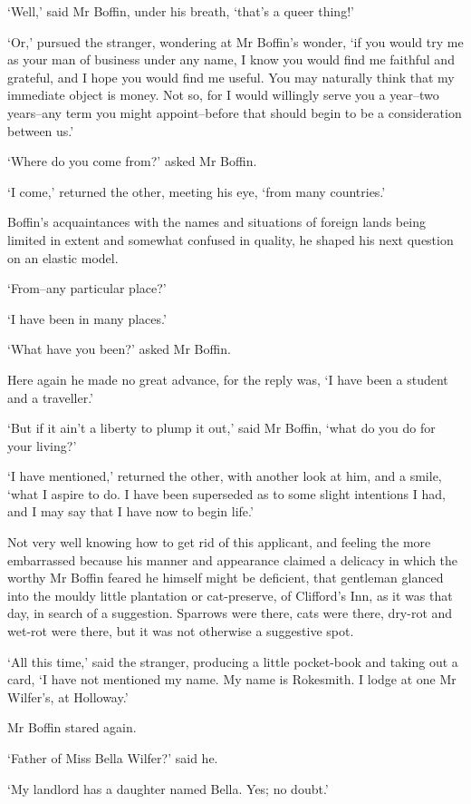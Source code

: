 ‘Well,’ said Mr Boffin, under his breath, ‘that’s a queer thing!’

‘Or,’ pursued the stranger, wondering at Mr Boffin’s wonder, ‘if you
would try me as your man of business under any name, I know you would
find me faithful and grateful, and I hope you would find me useful. You
may naturally think that my immediate object is money. Not so, for
I would willingly serve you a year--two years--any term you might
appoint--before that should begin to be a consideration between us.’

‘Where do you come from?’ asked Mr Boffin.

‘I come,’ returned the other, meeting his eye, ‘from many countries.’

Boffin’s acquaintances with the names and situations of foreign lands
being limited in extent and somewhat confused in quality, he shaped his
next question on an elastic model.

‘From--any particular place?’

‘I have been in many places.’

‘What have you been?’ asked Mr Boffin.

Here again he made no great advance, for the reply was, ‘I have been a
student and a traveller.’

‘But if it ain’t a liberty to plump it out,’ said Mr Boffin, ‘what do
you do for your living?’

‘I have mentioned,’ returned the other, with another look at him, and
a smile, ‘what I aspire to do. I have been superseded as to some slight
intentions I had, and I may say that I have now to begin life.’

Not very well knowing how to get rid of this applicant, and feeling the
more embarrassed because his manner and appearance claimed a delicacy
in which the worthy Mr Boffin feared he himself might be deficient, that
gentleman glanced into the mouldy little plantation or cat-preserve, of
Clifford’s Inn, as it was that day, in search of a suggestion. Sparrows
were there, cats were there, dry-rot and wet-rot were there, but it was
not otherwise a suggestive spot.

‘All this time,’ said the stranger, producing a little pocket-book and
taking out a card, ‘I have not mentioned my name. My name is Rokesmith.
I lodge at one Mr Wilfer’s, at Holloway.’

Mr Boffin stared again.

‘Father of Miss Bella Wilfer?’ said he.

‘My landlord has a daughter named Bella. Yes; no doubt.’

